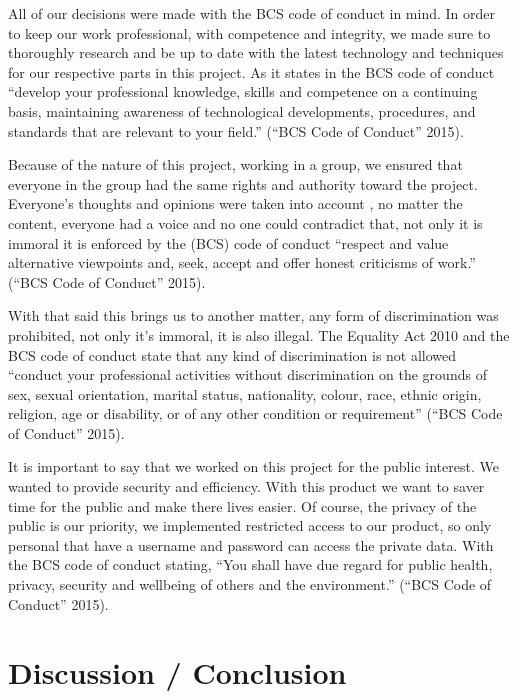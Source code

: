 \documentclass[
  english,
  a4paper,
,tablecaptionabove
]{scrartcl}
\begin{document}
All of our decisions were made with the BCS code of conduct in mind. In
order to keep our work professional, with competence and integrity, we
made sure to thoroughly research and be up to date with the latest
technology and techniques for our respective parts in this project. As
it states in the BCS code of conduct \enquote{develop your professional
knowledge, skills and competence on a continuing basis, maintaining
awareness of technological developments, procedures, and standards that
are relevant to your field.} (``BCS Code of Conduct'' 2015).

Because of the nature of this project, working in a group, we ensured
that everyone in the group had the same rights and authority toward the
project. Everyone's thoughts and opinions were taken into account , no
matter the content, everyone had a voice and no one could contradict
that, not only it is immoral it is enforced by the (BCS) code of conduct
\enquote{respect and value alternative viewpoints and, seek, accept and
offer honest criticisms of work.} (``BCS Code of Conduct'' 2015).

With that said this brings us to another matter, any form of
discrimination was prohibited, not only it's immoral, it is also
illegal. The Equality Act 2010 and the BCS code of conduct state that
any kind of discrimination is not allowed \enquote{conduct your
professional activities without discrimination on the grounds of sex,
sexual orientation, marital status, nationality, colour, race, ethnic
origin, religion, age or disability, or of any other condition or
requirement} (``BCS Code of Conduct'' 2015).

It is important to say that we worked on this project for the public
interest. We wanted to provide security and efficiency. With this
product we want to saver time for the public and make there lives
easier. Of course, the privacy of the public is our priority, we
implemented restricted access to our product, so only personal that have
a username and password can access the private data. With the BCS code
of conduct stating, \enquote{You shall have due regard for public
health, privacy, security and wellbeing of others and the environment.}
(``BCS Code of Conduct'' 2015).

\newpage

\hypertarget{discussion-conclusion}{%
\section{Discussion / Conclusion}\label{discussion-conclusion}}
\end{document}
